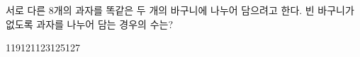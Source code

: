 \hspace*{2mm}\begin{minipage}[t]{\dimexpr\linewidth-2mm\relax}\vspace{0pt}
서로 다른 $8$개의 과자를 똑같은 두 개의 바구니에 나누어 담으려고 한다. 빈 바구니가 없도록 과자를 나누어 담는 경우의 수는?
\begin{choices32}{119}{121}{123}{125}{127}\end{choices32}\end{minipage}
